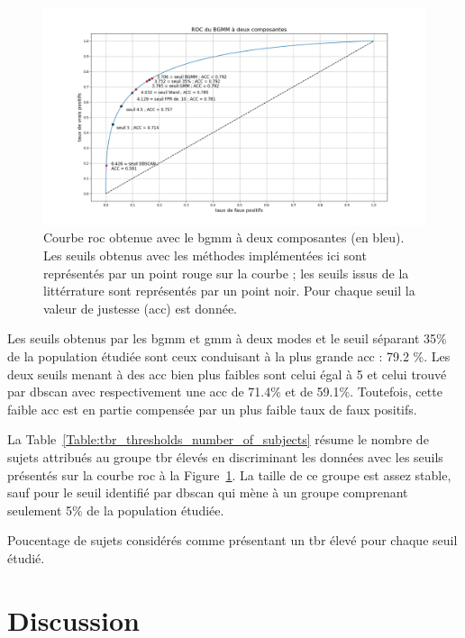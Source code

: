 \begin{figure}[h!]
  \centering
	\includegraphics[width=1.0\linewidth]{figures/chapter-4/tbr-roc} 
  \caption{Courbe \gls{roc} obtenue avec le \gls{bgmm} à deux composantes (en bleu). Les seuils obtenus avec les méthodes implémentées ici sont représentés 
	par un point rouge sur la courbe ; les seuils issus de la littérrature sont représentés par un point noir. Pour chaque seuil la valeur de justesse (\gls{acc}) 
	est donnée.}
  \label{Figure:tbr_roc}
\end{figure}

Les seuils obtenus par les \gls{bgmm} et \gls{gmm} à deux modes et le seuil séparant 35\% de la population étudiée sont ceux conduisant à la plus grande \gls{acc} :
79.2 \%. Les deux seuils menant à des \gls{acc} bien plus faibles sont celui égal à 5 et celui trouvé par \gls{dbscan} avec respectivement une \gls{acc} de 71.4\%
et de 59.1\%. Toutefois, cette faible \gls{acc} est en partie compensée par un plus faible taux de faux positifs.

La Table~\ref{Table:tbr_thresholds_number_of_subjects} résume le nombre de sujets attribués au groupe \gls{tbr} élevés en discriminant les données 
avec les seuils présentés sur la courbe \gls{roc} à la Figure~\ref{Figure:tbr_roc}. La taille de ce groupe est assez stable, sauf pour le seuil identifié 
par \gls{dbscan} qui mène à un groupe comprenant seulement 5\% de la population étudiée.
\begin{table}[h!]
  \centering
  \caption{Poucentage de sujets considérés comme présentant un \gls{tbr} élevé pour chaque seuil étudié.}
  
  \label{Table:tbr_thresholds_number_of_subjects}
\end{table}


\section{Discussion}

